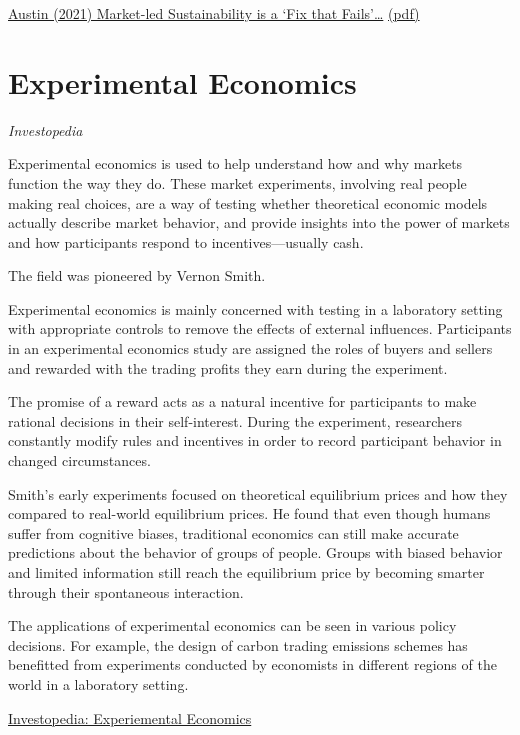 \documentclass[
]{book}
\begin{document}
\href{https://bothbrainsrequire\%20d.com/2021/10/25/fix-that-fails/}{Austin (2021) Market-led Sustainability is a `Fix that Fails'\ldots{}}
\href{pdf/Austin_2021_Market_Led_Sustainability_Fix_Fails.pdf}{(pdf)}

\hypertarget{experimental-economics}{%
\chapter{Experimental Economics}\label{experimental-economics}}

\emph{Investopedia}

Experimental economics is used to help understand how and why markets function the way they do. These market experiments, involving real people making real choices, are a way of testing whether theoretical economic models actually describe market behavior, and provide insights into the power of markets and how participants respond to incentives---usually cash.

The field was pioneered by Vernon Smith.

Experimental economics is mainly concerned with testing in a laboratory setting with appropriate controls to remove the effects of external influences. Participants in an experimental economics study are assigned the roles of buyers and sellers and rewarded with the trading profits they earn during the experiment.

The promise of a reward acts as a natural incentive for participants to make rational decisions in their self-interest. During the experiment, researchers constantly modify rules and incentives in order to record participant behavior in changed circumstances.

Smith's early experiments focused on theoretical equilibrium prices and how they compared to real-world equilibrium prices. He found that even though humans suffer from cognitive biases, traditional economics can still make accurate predictions about the behavior of groups of people. Groups with biased behavior and limited information still reach the equilibrium price by becoming smarter through their spontaneous interaction.

The applications of experimental economics can be seen in various policy decisions. For example, the design of carbon trading emissions schemes has benefitted from experiments conducted by economists in different regions of the world in a laboratory setting.

\href{https://www.investopedia.com/terms/e/experimental-economics.asp}{Investopedia: Experiemental Economics}
\end{document}
